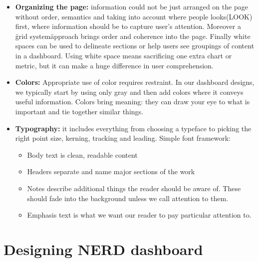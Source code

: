 \documentclass[a4paper,13pt]{report}
\begin{document}
\begin{itemize}
\item \textbf{Organizing the page: } information could not be just arranged on the page without order, semantics and taking into account where people looks(LOOK) first, where information should be to capture user's attention.
Moreover a \"grid system\" approach brings order and coherence into the page. Finally white spaces can be used to delineate sections or help users see groupings of content in a dashboard. Using white space means sacrificing one extra chart or metric, but it can make a huge difference in user comprehension.

\item \textbf{Colors:}
Appropriate use of color requires restraint. In our dashboard designs, we typically start by using only gray and then add colors where it conveys useful information.
Colors bring meaning: they can draw your eye to what is important and tie together similar things.

\item \textbf{Typography: }it includes everything from choosing a typeface to picking the right point size, kerning, tracking and leading.
Simple font framework:
\begin{itemize}                                    
\item Body text is clean, readable content
\item Headers separate and name major sections of the work                                                       
\item Notes describe additional things the reader should be aware of. These should fade into the background unless we call attention to them.
\item Emphasis text is what we want our reader to pay particular attention to.   
\end{itemize}
\end{itemize}

\chapter{Designing NERD dashboard}
\end{document}
